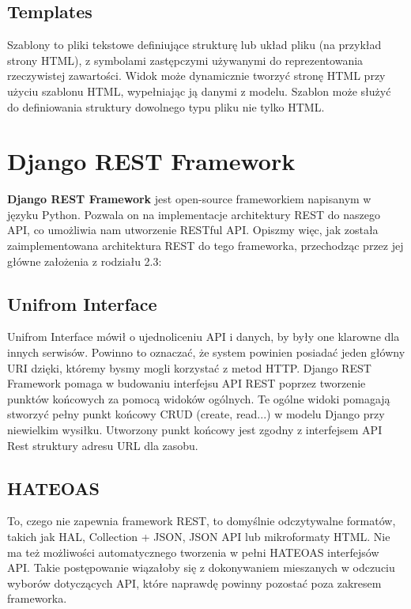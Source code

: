 \documentclass[oneside,polski,logo,indent]{amuthesis}
\begin{document}
\begin{enumerate}
\begin{enumerate}
\begin{center}
\subsection{Templates}
\end{center}
Szablony to pliki tekstowe definiujące strukturę lub układ pliku (na przykład strony HTML), z symbolami zastępczymi używanymi do reprezentowania rzeczywistej zawartości. Widok może dynamicznie tworzyć stronę HTML przy użyciu szablonu HTML, wypełniając ją danymi z modelu. Szablon może służyć do definiowania struktury dowolnego typu pliku nie tylko HTML.

\section{Django REST Framework}
\textbf{Django REST Framework} jest open-source frameworkiem napisanym w języku Python. Pozwala on na implementacje architektury REST do naszego API, co umożliwia nam utworzenie RESTful API. Opiszmy więc, jak została zaimplementowana architektura REST do tego frameworka, przechodząc przez jej główne założenia z rodziału 2.3:

\begin{center}
\subsection{Unifrom Interface}
\end{center}
Unifrom Interface mówił o ujednoliceniu API i danych, by były one klarowne dla innych serwisów. Powinno to oznaczać, że system powinien posiadać jeden główny URI dzięki, któremy bysmy mogli korzystać z metod HTTP. Django REST Framework pomaga w budowaniu interfejsu API REST poprzez tworzenie punktów końcowych za pomocą widoków ogólnych. Te ogólne widoki pomagają stworzyć pełny punkt końcowy CRUD (create, read...) w modelu Django przy niewielkim wysiłku. Utworzony punkt końcowy jest zgodny z interfejsem API Rest struktury adresu URL dla zasobu. 


\begin{center}
\subsection{HATEOAS}
\end{center}
To, czego nie zapewnia framework REST, to domyślnie odczytywalne formatów, takich jak HAL, Collection + JSON, JSON API lub mikroformaty HTML. Nie ma też możliwości automatycznego tworzenia w pełni HATEOAS interfejsów API. Takie postępowanie wiązałoby się z dokonywaniem mieszanych w odczuciu wyborów dotyczących API, które naprawdę powinny pozostać poza zakresem frameworka.



\end{enumerate}
\end{enumerate}
\end{document}
